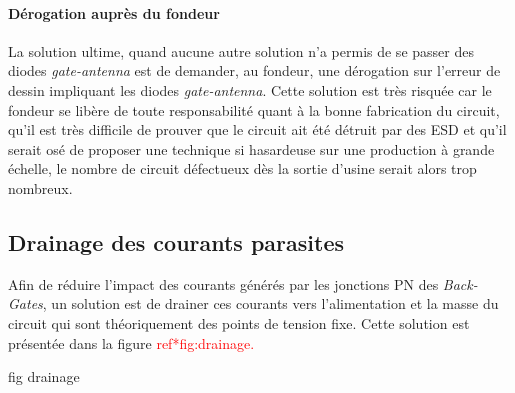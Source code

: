 \paragraph{Dérogation auprès du fondeur}
La solution ultime, quand aucune autre solution n’a permis de se passer des diodes \textit{gate-antenna} est de demander, au fondeur, une dérogation sur l’erreur de dessin impliquant les diodes \textit{gate-antenna}. Cette solution est très risquée car le fondeur se libère de toute responsabilité quant à la bonne fabrication du circuit, qu’il est très difficile de prouver que le circuit ait été détruit par des ESD et qu’il serait osé de proposer une technique si hasardeuse sur une production à grande échelle, le nombre de circuit défectueux dès la sortie d’usine serait alors trop nombreux.

\subsection{Drainage des courants parasites}
\label{sec:drainage}

Afin de réduire l'impact des courants générés par les jonctions PN des \textit{Back-Gates}, un solution est de drainer ces courants vers l'alimentation et la masse du circuit qui sont théoriquement des points de tension fixe. Cette solution est présentée dans la figure \textcolor{red}{ ref*{fig:drainage}.}

\begin{metsUneSource}
fig drainage
\end{metsUneSource}